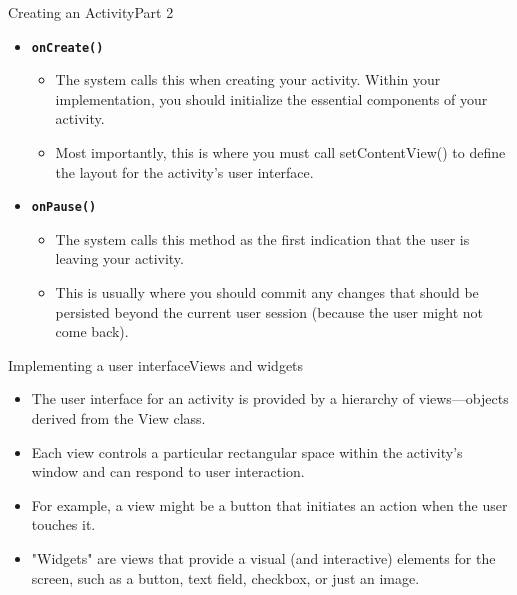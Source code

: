 \begin{frame}{Creating an Activity}{Part 2}
\begin{itemize}
    \item \textbf{\texttt{onCreate()}}
    \begin{itemize}
        \item The system calls this when creating your activity. Within
your implementation, you should initialize the essential
components of your activity.
        \item Most importantly, this is where you must call setContentView() to
        define the layout for the activity's user interface.
    \end{itemize}
    \item \textbf{\texttt{onPause()}}
    \begin{itemize}
        \item The system calls this method as the first indication
that the user is leaving your activity.
        \item This is usually where you should commit any
changes that should be persisted beyond the current user session (because the
user might not come back).
    \end{itemize}     
\end{itemize}
\end{frame}

\begin{frame}{Implementing a user interface}{Views and widgets}
\begin{itemize}
  \item The user interface for an activity is provided by a hierarchy of
  views—objects derived from the View class.
  \item Each view controls a particular rectangular space within the activity's
  window and can respond to user interaction.
  \item For example, a view might be a button that initiates an action when the
  user touches it.
  \item "Widgets" are views that provide a visual (and interactive) elements for the screen, such as a button, text field, 
checkbox, or just an image. 
\end{itemize}
\end{frame} 


